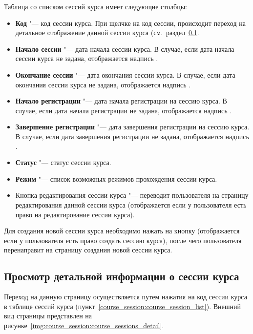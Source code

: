 	Таблица со списком сессий курса имеет следующие столбцы:
	\begin{itemize}
		\item \textbf{Код} "--- код сессии курса. При щелчке на код сессии, происходит переход на детальное отображение данной сессии курса (см.\ раздел~\ref{course_session:course_session_detail}.
		\item \textbf{Начало сессии} "--- дата начала сессии курса. В случае, если дата начала сессии курса не задана, отображается надпись .
		\item \textbf{Окончание сессии} "--- дата окончания сессии курса. В случае, если дата окончания сессии курса не задана, отображается надпись .
		\item \textbf{Начало регистрации} "--- дата начала регистрации на сессию курса. В случае, если дата начала регистрации не задана, отображается надпись .
		\item \textbf{Завершение регистрации} "--- дата завершения регистрации на сессию курса. В случае, если дата завершения регистрации не задана, отображается надпись .
		\item \textbf{Статус} "--- статус сессии курса.
		\item \textbf{Режим} "--- список возможных режимов прохождения сессии курса.
		\item Кнопка редактирования сессии курса  "--- переводит пользователя на страницу редактирования данной сессии курса (отображается если у пользователя есть право на редактирование сессии курса).
	\end{itemize}
	
	Для создания новой сессии курса необходимо нажать на кнопку  (отображается если у пользователя есть право создать сессию курса), после чего пользователя перенаправит на страницу создания новой сессии курса.

\subsection{Просмотр детальной информации о сессии курса}
\label{course_session:course_session_detail}
	Переход на данную страницу осуществляется путем нажатия на код сессии курса в таблице сессий курса (пункт~\ref{course_session:course_session_list}). Внешний вид страницы представлен на рисунке~\ref{img:course_session:course_sessions_detail}.
	
